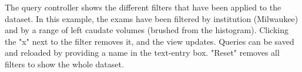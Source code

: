\label{fig:query}
The query controller shows the different filters that have been applied to the dataset. In this example, the exams have been filtered by institution (Milwaukee) and by a range of left caudate volumes (brushed from the histogram). Clicking the "x" next to the filter removes it, and the view updates. Queries can be saved and reloaded by providing a name in the text-entry box. "Reset" removes all filters to show the whole dataset.